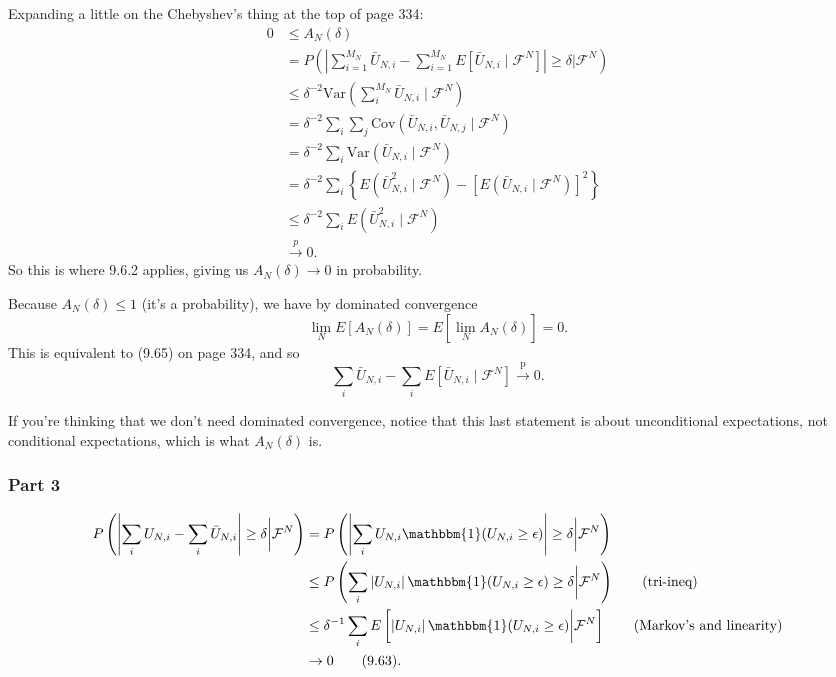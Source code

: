 \documentclass{article}
\begin{document}
Expanding a little on the Chebyshev's thing at the top of page 334:
\begin{align*}
0 &\le A_N(\delta) \\
&= P\left(\left| \sum_{i=1}^{M_N} \bar{U}_{N,i} - \sum_{i=1}^{M_N} E\left[\bar{U}_{N,i} \mid \mathcal{F}^N \right] \right| \ge \delta \bigg| \mathcal{F}^N \right) \tag{defn.} \\
&\le \delta^{-2} \text{Var}\left( \sum_i^{M_N} \bar{U}_{N,i} \mid \mathcal{F}^N \right) \tag{Chebyshev's} \\
&= \delta^{-2} \sum_i \sum_j \text{Cov}\left(\bar{U}_{N,i},\bar{U}_{N,j}  \mid \mathcal{F}^N  \right) \\
&= \delta^{-2}  \sum_i \text{Var}\left(\bar{U}_{N,i}  \mid \mathcal{F}^N  \right) \tag{independence} \\
&= \delta^{-2}  \sum_i \left\{  E\left(\bar{U}_{N,i}^2  \mid \mathcal{F}^N  \right) - [E\left(\bar{U}_{N,i}  \mid \mathcal{F}^N  \right) ]^2 \right\} \\
&\le \delta^{-2}  \sum_i E\left(\bar{U}_{N,i}^2  \mid \mathcal{F}^N  \right)  \\
&\overset{p}{\to} 0 \tag{9.62}.
\end{align*}
So this is where 9.6.2 applies, giving us $A_N(\delta) \to 0$ in probability.

Because $A_N(\delta) \le 1$ (it's a probability), we have by dominated convergence
\[
 \lim_N E[A_N(\delta)] = E[\lim_N A_N(\delta)] = 0.
\]
This is equivalent to (9.65) on page 334, and so 
$$
\sum_i \bar{U}_{N,i} - \sum_i E[ \bar{U}_{N,i}  \mid \mathcal{F}^N]  \overset{\text{p}}{\to} 0.
$$

If you're thinking that we don't need dominated convergence, notice that this last statement is about unconditional expectations, not conditional expectations, which is what $ A_N(\delta)$ is.

\subsubsection*{Part 3}


\begin{align*}
P\left(\left| \sum_i U_{N,i} - \sum_i \bar{U}_{N,i} \right| \ge \delta \bigg\rvert \mathcal{F}^N \right) 
&= P\left(\left| \sum_i U_{N,i} \mathbbm{1}(U_{N,i} \ge \epsilon ) \right| \ge \delta \bigg\rvert \mathcal{F}^N \right) \\
&\le P\left( \sum_i\left| U_{N,i}\right| \mathbbm{1}(U_{N,i} \ge \epsilon )   \ge \delta \bigg\rvert \mathcal{F}^N \right) \tag{tri-ineq} \\
&\le \delta^{-1} \sum_i E\left[\left| U_{N,i}\right| \mathbbm{1}(U_{N,i} \ge \epsilon )  \bigg\rvert \mathcal{F}^N \right] \tag{Markov's and linearity} \\
&\to 0 \tag{9.63}.
\end{align*}
\end{document}
